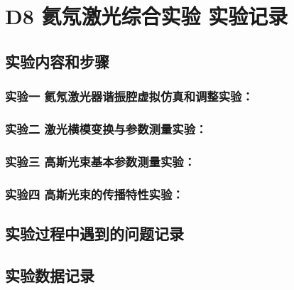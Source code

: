 \documentclass[dvipsnames, svgnames,a4paper,11pt]{article}
\begin{document}
\section{D8 \quad 氦氖激光综合实验 \quad\heiti 实验记录}

\subsection{实验内容和步骤}



	\subsubsection{实验一 \quad 氦氖激光器谐振腔虚拟仿真和调整实验：}

		

	
	\subsubsection{实验二 \quad 激光横模变换与参数测量实验：}
	
	
		

	\subsubsection{实验三 \quad 高斯光束基本参数测量实验：}
	

		

	
	\subsubsection{实验四 \quad 高斯光束的传播特性实验：}

	


	\subsection{实验过程中遇到的问题记录}

		


\subsection{实验数据记录}


	
\end{document}
